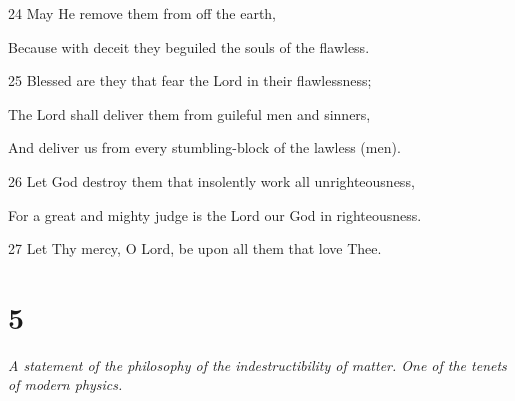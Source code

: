 \par 24 May He remove them from off the earth,
\par  Because with deceit they beguiled the souls of the flawless.
\par    
\par 25 Blessed are they that fear the Lord in their flawlessness;
\par  The Lord shall deliver them from guileful men and sinners,
\par  And deliver us from every stumbling-block of the lawless (men).
\par 26 Let God destroy them that insolently work all unrighteousness,
\par  For a great and mighty judge is the Lord our God in righteousness.
\par    
\par 27 Let Thy mercy, O Lord, be upon all them that love Thee.

\chapter{5}

\par \textit{A statement of the philosophy of the indestructibility of matter. One of the tenets of modern physics.}

